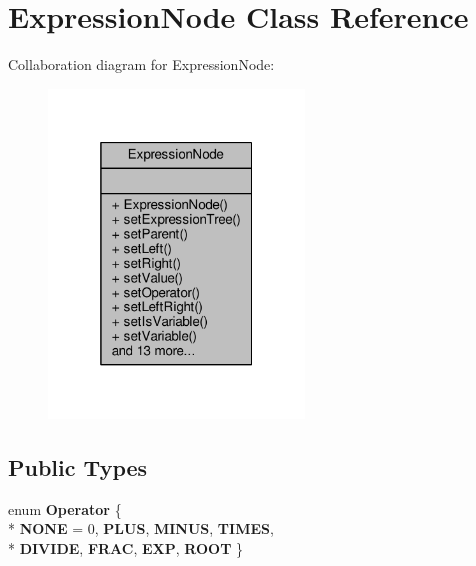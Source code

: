 \hypertarget{classExpressionNode}{}\section{Expression\+Node Class Reference}
\label{classExpressionNode}


Collaboration diagram for Expression\+Node\+:
\nopagebreak
\begin{figure}[H]
\begin{center}
\leavevmode
\includegraphics[width=193pt]{classExpressionNode__coll__graph}
\end{center}
\end{figure}
\subsection*{Public Types}
\begin{DoxyCompactItemize}
\item 
enum {\bfseries Operator} \{ \\*
{\bfseries N\+O\+NE} = 0, 
{\bfseries P\+L\+US}, 
{\bfseries M\+I\+N\+US}, 
{\bfseries T\+I\+M\+ES}, 
\\*
{\bfseries D\+I\+V\+I\+DE}, 
{\bfseries F\+R\+AC}, 
{\bfseries E\+XP}, 
{\bfseries R\+O\+OT}
 \}\hypertarget{classExpressionNode_a7735465f9aac516880869e4a630d2569}{}\label{classExpressionNode_a7735465f9aac516880869e4a630d2569}

\end{DoxyCompactItemize}
